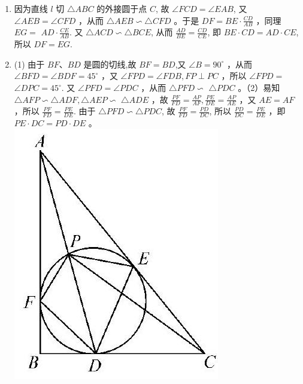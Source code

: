 \documentclass[10pt]{article}
\begin{document}
\begin{enumerate}
(第4题)
  \item 因为直线 $l$ 切 $\triangle A B C$ 的外接圆于点 $C$, 故 $\angle F C D=\angle E A B$, 又 $\angle A E B=\angle C F D$ ，从而 $\triangle A E B \backsim \triangle C F D$ 。于是 $D F=B E \cdot \frac{C D}{A B}$ ，同理 $E G=$ $A D \cdot \frac{C E}{A B}$. 又 $\triangle A C D \backsim \triangle B C E$, 从而 $\frac{A D}{B E}=\frac{C D}{C E}$, 即 $B E \cdot C D=A D \cdot C E$, 所以 $D F=E G$.
  \item (1) 由于 $B F 、 B D$ 是圆的切线,故 $B F=B D$,又 $\angle B=90^{\circ}$ ，从而 $\angle B F D=\angle B D F=45^{\circ}$ ，又 $\angle F P D=\angle F D B, F P \perp P C$ ，所以 $\angle F P D=$ $\angle D P C=45^{\circ}$. 又 $\angle P F D=\angle P D C$ ，从而 $\triangle P F D \backsim$ $\triangle P D C$ 。（2）易知 $\triangle A F P \backsim \triangle A D F, \triangle A E P \backsim$ $\triangle A D E$ ，故 $\frac{P F}{F D}=\frac{A P}{A F}, \frac{P E}{D E}=\frac{A P}{A E}$ ，又 $A E=A F$ ，所以 $\frac{P F}{F D}=\frac{P E}{D E}$. 由于 $\triangle P F D \backsim \triangle P D C$, 故 $\frac{P F}{F D}=\frac{P D}{D C}$, 所以 $\frac{P D}{D C}=\frac{P E}{D E}$ ，即 $P E \cdot D C=P D \cdot D E$ 。\\
\includegraphics[max width=\textwidth, center]{2024_10_30_66b8e5e701da2093c133g-094}\\

\end{enumerate}
\end{document}
